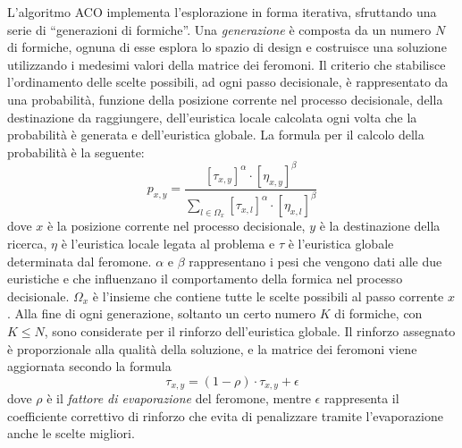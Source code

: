 L'algoritmo \ac{ACO} implementa l'esplorazione in forma iterativa, sfruttando una
serie di ``generazioni di formiche''. Una \emph{generazione} \`e composta da un
numero $N$ di formiche, ognuna di esse esplora lo spazio di design e costruisce una soluzione
utilizzando i medesimi valori della matrice dei feromoni. 
Il criterio che stabilisce l'ordinamento delle scelte possibili, ad ogni passo decisionale,
\`e rappresentato da una probabilit\`a, funzione della posizione corrente nel processo decisionale, 
della destinazione da raggiungere, dell'euristica locale calcolata ogni volta 
che la probabilità è generata e dell'euristica globale. La formula per il 
calcolo della probabilità è la seguente:
\begin{equation}
 p_{x,y} = \frac{[\tau_{x,y}]^{\alpha}\cdot[\eta_{x,y}]^{\beta}}{\sum_{l \in 
\Omega_{x}}[\tau_{x,l}]^{\alpha}\cdot[\eta_{x,l}]^{\beta}}
\end{equation}
dove $x$ è la posizione corrente nel processo decisionale, $y$ è la 
destinazione della ricerca, $\eta$ è l'euristica locale legata al problema e 
$\tau$ è l'euristica globale determinata dal feromone. $\alpha$ e $\beta$ 
rappresentano i pesi che vengono dati alle due euristiche e che influenzano il 
comportamento della formica nel processo decisionale. $\Omega_x$ è l'insieme che 
contiene tutte le scelte possibili al passo corrente $x$. Alla fine di ogni generazione,
soltanto un certo numero $K$ di formiche, con $K \leq N$, sono considerate per il rinforzo
dell'euristica globale. Il rinforzo assegnato \`e proporzionale alla qualit\`a della soluzione,
e la matrice dei feromoni viene aggiornata secondo la formula
\begin{equation}
 \tau_{x,y} = (1-\rho)\cdot \tau_{x,y} + \epsilon
\end{equation}
dove $\rho$ è il \emph{fattore di evaporazione} del feromone, mentre $\epsilon$ 
rappresenta il coefficiente correttivo di rinforzo che evita di penalizzare 
tramite l'evaporazione anche le scelte migliori.

